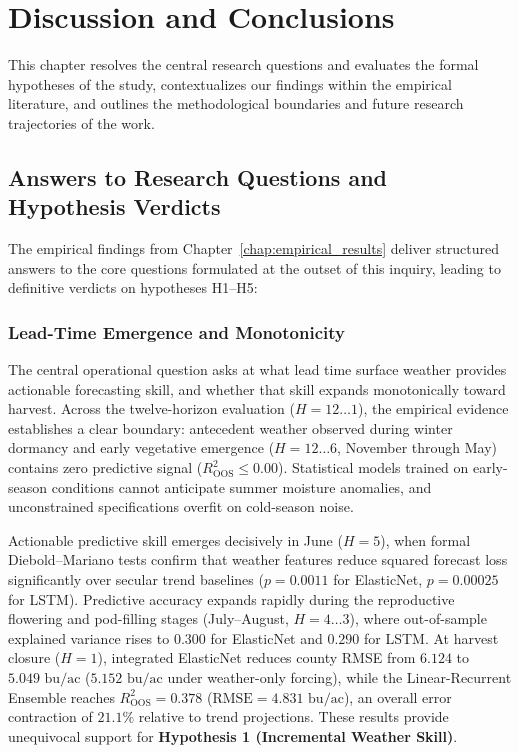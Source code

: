 \chapter{Discussion and Conclusions}
\label{chap:discussion_conclusions}

This chapter resolves the central research questions and evaluates the formal hypotheses of the study, contextualizes our findings within the empirical literature, and outlines the methodological boundaries and future research trajectories of the work.


\section{Answers to Research Questions and Hypothesis Verdicts}
\label{sec:disc_hypotheses}

The empirical findings from Chapter~\ref{chap:empirical_results} deliver structured answers to the core questions formulated at the outset of this inquiry, leading to definitive verdicts on hypotheses H1--H5:

\subsection{Lead-Time Emergence and Monotonicity}
The central operational question asks at what lead time surface weather provides actionable forecasting skill, and whether that skill expands monotonically toward harvest. Across the twelve-horizon evaluation ($H = 12 \dots 1$), the empirical evidence establishes a clear boundary: antecedent weather observed during winter dormancy and early vegetative emergence ($H = 12 \dots 6$, November through May) contains zero predictive signal ($R^2_{\text{OOS}} \le 0.00$). Statistical models trained on early-season conditions cannot anticipate summer moisture anomalies, and unconstrained specifications overfit on cold-season noise.

Actionable predictive skill emerges decisively in June ($H=5$), when formal Diebold--Mariano tests confirm that weather features reduce squared forecast loss significantly over secular trend baselines ($p = 0.0011$ for ElasticNet, $p = 0.00025$ for LSTM). Predictive accuracy expands rapidly during the reproductive flowering and pod-filling stages (July--August, $H=4 \dots 3$), where out-of-sample explained variance rises to $0.300$ for ElasticNet and $0.290$ for LSTM. At harvest closure ($H=1$), integrated ElasticNet reduces county RMSE from $6.124$ to $5.049\text{ bu/ac}$ ($5.152\text{ bu/ac}$ under weather-only forcing), while the Linear-Recurrent Ensemble reaches $R^2_{\text{OOS}} = 0.378$ ($\text{RMSE} = 4.831\text{ bu/ac}$), an overall error contraction of $21.1\%$ relative to trend projections. These results provide unequivocal support for \textbf{Hypothesis 1 (Incremental Weather Skill)}.

